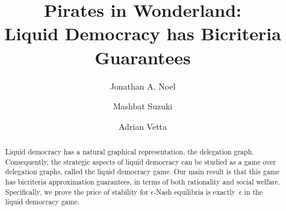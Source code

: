 \documentclass[runningheads]{llncs}
\begin{document}
%	
%
%
\title{Pirates in Wonderland:\\[0.1cm] Liquid Democracy has Bicriteria Guarantees}
%
%
\author{Jonathan A. Noel \and Mashbat Suzuki \and 
	Adrian Vetta
	}
%
%
\maketitle              %
%
\begin{abstract}
Liquid democracy has a natural graphical representation, the delegation graph.
Consequently, the strategic aspects of liquid democracy can be studied as a game
over delegation graphs, called the liquid democracy game. 
Our main result is that this game has bicriteria approximation guarantees, in terms
of both rationality and social welfare. Specifically, we prove the price of stability for $\epsilon$-Nash equilibria
is exactly~$\epsilon$ in the liquid democracy game. 
\end{abstract}










%




\end{document}
